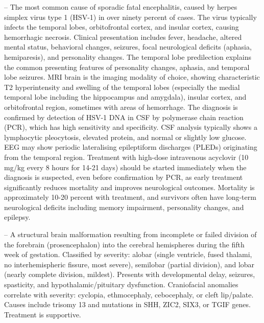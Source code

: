 -- The most common cause of sporadic fatal encephalitis, caused by herpes simplex virus type 1 (HSV-1) in over ninety percent of cases. The virus typically infects the temporal lobes, orbitofrontal cortex, and insular cortex, causing hemorrhagic necrosis. Clinical presentation includes fever, headache, altered mental status, behavioral changes, seizures, focal neurological deficits (aphasia, hemiparesis), and personality changes. The temporal lobe predilection explains the common presenting features of personality changes, aphasia, and temporal lobe seizures. MRI brain is the imaging modality of choice, showing characteristic T2 hyperintensity and swelling of the temporal lobes (especially the medial temporal lobe including the hippocampus and amygdala), insular cortex, and orbitofrontal region, sometimes with areas of hemorrhage. The diagnosis is confirmed by detection of HSV-1 DNA in CSF by polymerase chain reaction (PCR), which has high sensitivity and specificity. CSF analysis typically shows a lymphocytic pleocytosis, elevated protein, and normal or slightly low glucose. EEG may show periodic lateralising epileptiform discharges (PLEDs) originating from the temporal region. Treatment with high-dose intravenous acyclovir (10 mg/kg every 8 hours for 14-21 days) should be started immediately when the diagnosis is suspected, even before confirmation by PCR, as early treatment significantly reduces mortality and improves neurological outcomes. Mortality is approximately 10-20 percent with treatment, and survivors often have long-term neurological deficits including memory impairment, personality changes, and epilepsy.

-- A structural brain malformation resulting from incomplete or failed division of the forebrain (prosencephalon) into the cerebral hemispheres during the fifth week of gestation. Classified by severity: alobar (single ventricle, fused thalami, no interhemispheric fissure, most severe), semilobar (partial division), and lobar (nearly complete division, mildest). Presents with developmental delay, seizures, spasticity, and hypothalamic/pituitary dysfunction. Craniofacial anomalies correlate with severity: cyclopia, ethmocephaly, cebocephaly, or cleft lip/palate. Causes include trisomy 13 and mutations in SHH, ZIC2, SIX3, or TGIF genes. Treatment is supportive.

